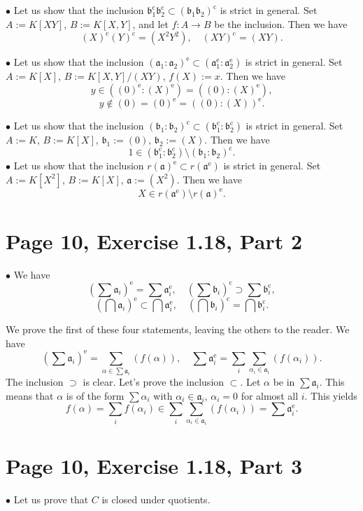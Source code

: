 \documentclass[parskip=half]{scrartcl}%
\newcommand{\oo}{\operatorname}
\newcommand{\mf}{\mathfrak}
\newcommand{\bu}{\bullet}
\begin{document}
$\bu$ Let us show that the inclusion $\mf b_1^{\oo c}\mf b_2^{\oo c}\subset(\mf b_1\mf b_2)^{\oo c}$ is strict in general. Set $A:=K[XY]$, $B:=K[X,Y]$, and let $f:A\to B$ be the inclusion. Then we have 
$$
(X)^{\oo c}(Y)^{\oo c}=(X^2Y^2),\quad(XY)^{\oo c}=(XY).
$$

$\bu$ Let us show that the inclusion $(\mf a_1:\mf a_2)^{\oo e}\subset(\mf a_1^{\oo e}:\mf a_2^{\oo e})$ is strict in general. Set $A:=K[X]$, $B:=K[X,Y]/(XY)$, $f(X):=x$. Then we have 
$$
y\in((0)^{\oo e}:(X)^{\oo e})=((0):(X)^{\oo e}),
$$ 
$$y\notin(0)=(0)^{\oo e}=((0):(X))^{\oo e}.$$

$\bu$ Let us show that the inclusion $(\mf b_1:\mf b_2)^{\oo c}\subset(\mf b_1^{\oo c}:\mf b_2^{\oo c})$ is strict in general. Set $A:=K$, $B:=K[X]$, $\mf b_1:=(0)$, $\mf b_2:=(X)$. Then we have 
$$
1\in(\mf b_1^{\oo c}:\mf b_2^{\oo c})\setminus(\mf b_1:\mf b_2)^{\oo c}.
$$
$\bu$ Let us show that the inclusion $r(\mf a)^{\oo e}\subset r(\mf a^{\oo e})$ is strict in general. Set $A:=K[X^2]$, $B:=K[X]$, $\mf a:=(X^2)$. Then we have 
$$
X\in r(\mf a^{\oo e})\setminus r(\mf a)^{\oo e}.
$$

\section{Page 10, Exercise 1.18, Part 2}%

$\bu$ We have 
$$
\left(\sum\mf a_i\right)^{\oo e}=\sum\mf a_i^{\oo e},\quad\left(\sum\mf b_i\right)^{\oo c}\supset\sum\mf b_i^{\oo c},
$$
$$
\left(\bigcap\mf a_i\right)^{\oo e}\subset\bigcap\mf a_i^{\oo e},\quad\left(\bigcap\mf b_i\right)^{\oo c}=\bigcap\mf b_i^{\oo c}.
$$

We prove the first of these four statements, leaving the others to the reader. We have 
$$
\left(\sum\mf a_i\right)^{\oo e}=\sum_{\alpha\in\sum\mf a_i}(f(\alpha)),\quad\sum\mf a_i^{\oo e}=\sum_i\sum_{\alpha_i\in\mf a_i}(f(\alpha_i)).
$$ 
The inclusion $\supset$ is clear. Let's prove the inclusion $\subset$. Let $\alpha$ be in $\sum\mf a_i$. This means that $\alpha$ is of the form $\sum\alpha_i$ with $\alpha_i\in\mf a_i$, $\alpha_i=0$ for almost all $i$. This yields 
$$
f(\alpha)=\sum_if(\alpha_i)\in\sum_i\sum_{\alpha_i\in\mf a_i}(f(\alpha_i))=\sum\mf a_i^{\oo e}.
$$ 

\section{Page 10, Exercise 1.18, Part 3}%

$\bu$ Let us prove that $C$ is closed under quotients. 
\end{document}
